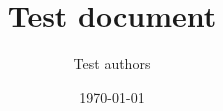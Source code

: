 \usepackage{iftex}
\ifPDFTeX
  \usepackage[T1]{fontenc}
\fi
\usepackage[english]{babel}
\usepackage{amsmath,amssymb}
\usepackage{graphicx}
\usepackage[backend=biber,style=authoryear]{biblatex}
\usepackage{hyperref}
\makeatletter
\hypersetup{hidelinks}
\makeatother
\title{Test document}
\author{Test authors}
\date{\today}
